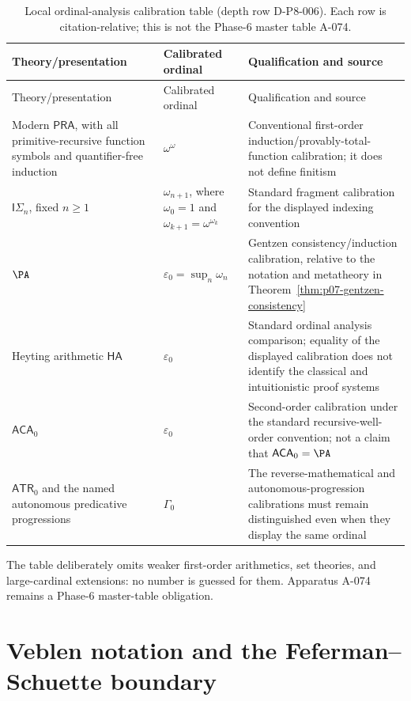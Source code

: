 \begingroup\small
\begin{longtable}{@{}p{}p{}p{}@{}}
\caption{Local ordinal-analysis calibration table (depth row D-P8-006).  Each
row is citation-relative; this is not the Phase-6 master table A-074.}
\label{tab:p07-ordinal-calibration}\\
\toprule
Theory/presentation & Calibrated ordinal & Qualification and source \\
\midrule
\endfirsthead
\toprule
Theory/presentation & Calibrated ordinal & Qualification and source \\
\midrule
\endhead
Modern \(\mathsf{PRA}\), with all primitive-recursive function symbols and
quantifier-free induction & \(\omega^\omega\) & Conventional first-order
induction/provably-total-function calibration; it does not define finitism
\cite{Pohlers2009} \\
\(\mathsf I\Sigma_n\), fixed \(n\geq1\) & \(\omega_{n+1}\), where
\(\omega_0=1\) and \(\omega_{k+1}=\omega^{\omega_k}\) & Standard
fragment calibration for the displayed indexing convention
\cite{Pohlers2009} \\
\(\PA\) & \(\varepsilon_0=\sup_n\omega_n\) & Gentzen
consistency/induction calibration, relative to the notation and metatheory in
Theorem~\ref{thm:p07-gentzen-consistency}
\cite{Gentzen1936,TroelstraSchwichtenberg2000} \\
Heyting arithmetic \(\mathsf{HA}\) & \(\varepsilon_0\) & Standard ordinal
analysis comparison; equality of the displayed calibration does not identify
the classical and intuitionistic proof systems \cite{Pohlers2009} \\
\(\mathsf{ACA}_0\) & \(\varepsilon_0\) & Second-order calibration under the
standard recursive-well-order convention; not a claim that
\(\mathsf{ACA}_0=\PA\) \cite{Simpson2009,Pohlers2009} \\
\(\mathsf{ATR}_0\) and the named autonomous predicative progressions &
\(\Gamma_0\) & The reverse-mathematical and autonomous-progression
calibrations must remain distinguished even when they display the same
ordinal \cite{Feferman1964,Schuette1977,Simpson2009} \\
\bottomrule
\end{longtable}
\endgroup

The table deliberately omits weaker first-order arithmetics, set theories,
and large-cardinal extensions: no number is guessed for them.  Apparatus
A-074 remains a Phase-6 master-table obligation.

\section{Veblen notation and the Feferman--Schuette boundary}
\label{sec:p07-veblen}

